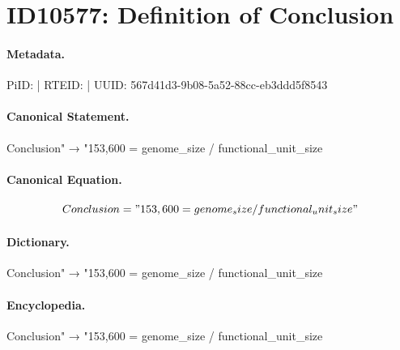 \section*{ID10577: Definition of Conclusion}
\paragraph{Metadata.}
PiID:  | RTEID:  | UUID: 567d41d3-9b08-5a52-88cc-eb3ddd5f8543

\paragraph{Canonical Statement.}
Conclusion" → "153,600 = genome\_size / functional\_unit\_size

\paragraph{Canonical Equation.}
\[
Conclusion = "153,600 = genome_size / functional_unit_size"
\]

\paragraph{Dictionary.}
Conclusion" → "153,600 = genome\_size / functional\_unit\_size

\paragraph{Encyclopedia.}
Conclusion" → "153,600 = genome\_size / functional\_unit\_size
